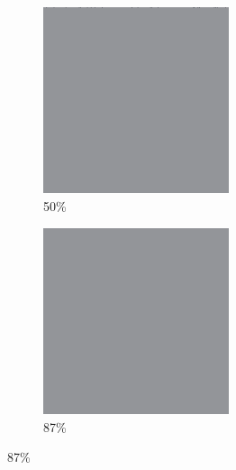 \documentclass[12pt, fleqn]{report}                             %
\theoremstyle{break}                                            %
\begin{document}
\begin{figure}[ht!]
\begin{subfigure}[b]{0.4\linewidth}
          \includegraphics[width=0.6\textwidth]{Images/19/c.png}
          \caption{50\%}
        \end{subfigure}
        \begin{subfigure}[b]{0.4\linewidth}
          \includegraphics[width=0.6\textwidth]{Images/19/d.png}
          \caption{87\%}
        \end{subfigure}
      \end{figure}
\end{document}
